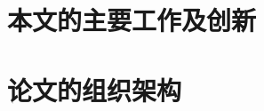 \section[\hspace{-2pt}本文的主要工作及创新]{{ \hspace{-8pt}本文的主要工作及创新}}\label{section 1-3}


\section[\hspace{-2pt}论文的组织架构]{{ \hspace{-8pt}论文的组织架构}}\label{section 1-4}





